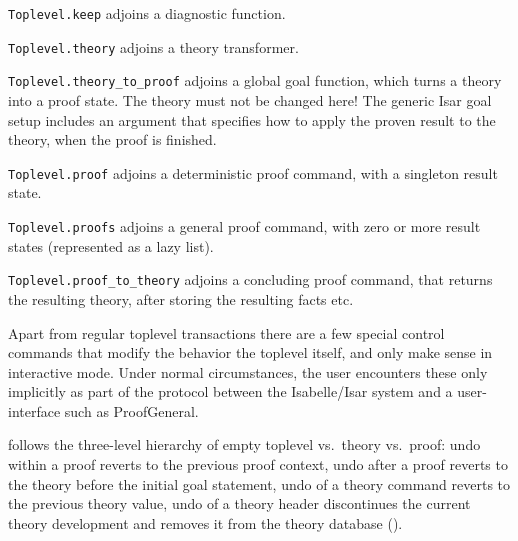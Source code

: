\begin{isabellebody}
\begin{isamarkuptext}
\begin{description}
  \item \verb|Toplevel.keep| adjoins a diagnostic function.

  \item \verb|Toplevel.theory| adjoins a theory transformer.

  \item \verb|Toplevel.theory_to_proof| adjoins a global goal function,
  which turns a theory into a proof state.  The theory must not be
  changed here!  The generic Isar goal setup includes an argument that
  specifies how to apply the proven result to the theory, when the
  proof is finished.

  \item \verb|Toplevel.proof| adjoins a deterministic proof command,
  with a singleton result state.

  \item \verb|Toplevel.proofs| adjoins a general proof command, with
  zero or more result states (represented as a lazy list).

  \item \verb|Toplevel.proof_to_theory| adjoins a concluding proof
  command, that returns the resulting theory, after storing the
  resulting facts etc.

  \end{description}%
\end{isamarkuptext}%
\isamarkuptrue%
%
\endisatagmlref
{\isafoldmlref}%
%
\isadelimmlref
%
\endisadelimmlref
%
\isamarkuptrue%
%
\begin{isamarkuptext}%
Apart from regular toplevel transactions there are a few
  special control commands that modify the behavior the toplevel
  itself, and only make sense in interactive mode.  Under normal
  circumstances, the user encounters these only implicitly as part of
  the protocol between the Isabelle/Isar system and a user-interface
  such as ProofGeneral.

  \begin{description}

  \item {} follows the three-level hierarchy of empty
  toplevel vs.\ theory vs.\ proof: undo within a proof reverts to the
  previous proof context, undo after a proof reverts to the theory
  before the initial goal statement, undo of a theory command reverts
  to the previous theory value, undo of a theory header discontinues
  the current theory development and removes it from the theory
  database ().


\end{description}
\end{isamarkuptext}
\end{isabellebody}
